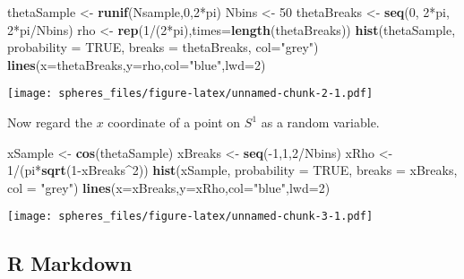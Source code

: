 \documentclass[]{article}
\newenvironment{Shaded}{\begin{snugshade}}{\end{snugshade}}
\newcommand{\KeywordTok}[1]{\textcolor[rgb]{0.13,0.29,0.53}{\textbf{{#1}}}}
\newcommand{\DataTypeTok}[1]{\textcolor[rgb]{0.13,0.29,0.53}{{#1}}}
\newcommand{\DecValTok}[1]{\textcolor[rgb]{0.00,0.00,0.81}{{#1}}}
\newcommand{\StringTok}[1]{\textcolor[rgb]{0.31,0.60,0.02}{{#1}}}
\newcommand{\OtherTok}[1]{\textcolor[rgb]{0.56,0.35,0.01}{{#1}}}
\newcommand{\NormalTok}[1]{{#1}}
\begin{document}
\begin{Shaded}
\begin{Highlighting}[]
\NormalTok{thetaSample <-}\StringTok{ }\KeywordTok{runif}\NormalTok{(Nsample,}\DecValTok{0}\NormalTok{,}\DecValTok{2}\NormalTok{*pi)}
\NormalTok{Nbins <-}\StringTok{ }\DecValTok{50}
\NormalTok{thetaBreaks <-}\StringTok{ }\KeywordTok{seq}\NormalTok{(}\DecValTok{0}\NormalTok{, }\DecValTok{2}\NormalTok{*pi, }\DecValTok{2}\NormalTok{*pi/Nbins)}
\NormalTok{rho <-}\StringTok{ }\KeywordTok{rep}\NormalTok{(}\DecValTok{1}\NormalTok{/(}\DecValTok{2}\NormalTok{*pi),}\DataTypeTok{times=}\KeywordTok{length}\NormalTok{(thetaBreaks))}
\KeywordTok{hist}\NormalTok{(thetaSample, }\DataTypeTok{probability =} \OtherTok{TRUE}\NormalTok{, }\DataTypeTok{breaks =} \NormalTok{thetaBreaks, }\DataTypeTok{col=}\StringTok{"grey"}\NormalTok{)}
\KeywordTok{lines}\NormalTok{(}\DataTypeTok{x=}\NormalTok{thetaBreaks,}\DataTypeTok{y=}\NormalTok{rho,}\DataTypeTok{col=}\StringTok{"blue"}\NormalTok{,}\DataTypeTok{lwd=}\DecValTok{2}\NormalTok{)}
\end{Highlighting}
\end{Shaded}

\texttt{[image: spheres\_files/figure-latex/unnamed-chunk-2-1.pdf]}

Now regard the \(x\) coordinate of a point on \(S^1\) as a random
variable.

\begin{Shaded}
\begin{Highlighting}[]
\NormalTok{xSample <-}\StringTok{ }\KeywordTok{cos}\NormalTok{(thetaSample)}
\NormalTok{xBreaks <-}\StringTok{ }\KeywordTok{seq}\NormalTok{(-}\DecValTok{1}\NormalTok{,}\DecValTok{1}\NormalTok{,}\DecValTok{2}\NormalTok{/Nbins)}
\NormalTok{xRho <-}\StringTok{ }\DecValTok{1}\NormalTok{/(pi*}\KeywordTok{sqrt}\NormalTok{(}\DecValTok{1}\NormalTok{-xBreaks^}\DecValTok{2}\NormalTok{))}
\KeywordTok{hist}\NormalTok{(xSample, }\DataTypeTok{probability =} \OtherTok{TRUE}\NormalTok{, }\DataTypeTok{breaks =} \NormalTok{xBreaks, }\DataTypeTok{col =} \StringTok{"grey"}\NormalTok{)}
\KeywordTok{lines}\NormalTok{(}\DataTypeTok{x=}\NormalTok{xBreaks,}\DataTypeTok{y=}\NormalTok{xRho,}\DataTypeTok{col=}\StringTok{"blue"}\NormalTok{,}\DataTypeTok{lwd=}\DecValTok{2}\NormalTok{)}
\end{Highlighting}
\end{Shaded}

\texttt{[image: spheres\_files/figure-latex/unnamed-chunk-3-1.pdf]}

\subsection{R Markdown}\label{r-markdown}
\end{document}
